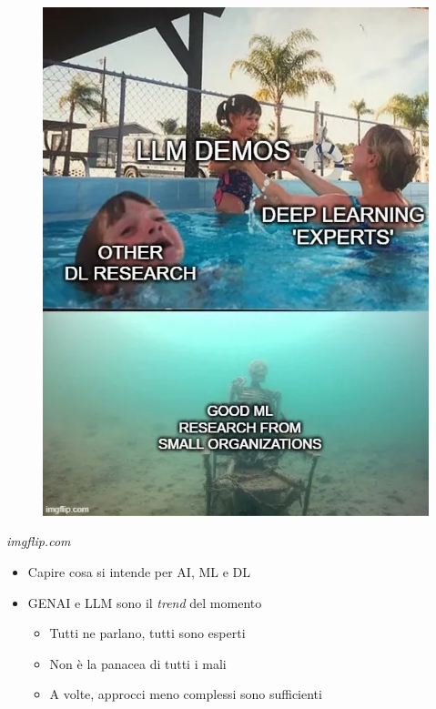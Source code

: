 \begin{frame}[t,fragile]
{\begin{minipage}[b]{\textwidth}
\begin{minipage}[b]{0.33\textwidth}
\begin{figure}[ht]
                \includegraphics[width=\textwidth]{img/meme-1.png}
            \end{figure}
            \begin{flushright}
                \vspace*{-7pt}
                {\tiny\textit{\textcopyright imgflip.com}}
            \end{flushright}
        \end{minipage}
    \end{minipage}
    \begin{itemize}[leftmargin=10pt,align=right]
        \item[\alert{\faHandORight}] Capire cosa si intende per AI, ML e DL
        \item[\alert{\faHandORight}] GENAI e LLM sono il \textit{trend} del momento
        \begin{itemize}[leftmargin=10pt,align=right]
            \item[\alert{\faHandORight}] Tutti ne parlano, tutti sono esperti
            \item[\alert{\faHandORight}] \alert{Non} è la panacea di tutti i mali
            \item[\alert{\faHandORight}] A volte, approcci meno complessi sono sufficienti
        \end{itemize}
    \end{itemize}
}
\end{frame}


